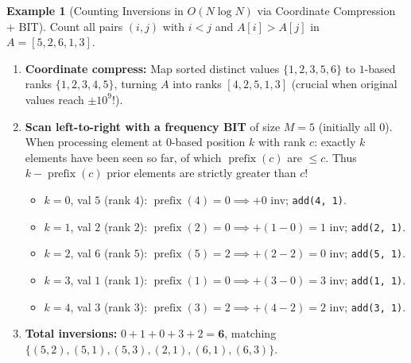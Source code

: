 \documentclass[11pt,a4paper]{article}
\theoremstyle{definition}
\newtheorem{example}{Example}[section]
\begin{document}
\begin{example}[Counting Inversions in $O(N \log N)$ via Coordinate Compression + BIT]
Count all pairs $(i, j)$ with $i < j$ and $A[i] > A[j]$ in $A = [5, 2, 6, 1, 3]$.
\begin{enumerate}[itemsep=2pt, topsep=2pt]
    \item \textbf{Coordinate compress:} Map sorted distinct values $\{1, 2, 3, 5, 6\}$ to $1$-based ranks $\{1, 2, 3, 4, 5\}$, turning $A$ into ranks $[4, 2, 5, 1, 3]$ (crucial when original values reach $\pm 10^9$!).
    \item \textbf{Scan left-to-right with a frequency BIT} of size $M = 5$ (initially all $0$). When processing element at $0$-based position $k$ with rank $c$: exactly $k$ elements have been seen so far, of which $\operatorname{prefix}(c)$ are $\le c$. Thus $k - \operatorname{prefix}(c)$ prior elements are strictly greater than $c$!
    \begin{itemize}[itemsep=1pt, topsep=1pt]
        \item $k = 0$, val $5$ (rank $4$): $\operatorname{prefix}(4) = 0 \implies +0$ inv; \texttt{add(4, 1)}.
        \item $k = 1$, val $2$ (rank $2$): $\operatorname{prefix}(2) = 0 \implies +(1 - 0) = 1$ inv; \texttt{add(2, 1)}.
        \item $k = 2$, val $6$ (rank $5$): $\operatorname{prefix}(5) = 2 \implies +(2 - 2) = 0$ inv; \texttt{add(5, 1)}.
        \item $k = 3$, val $1$ (rank $1$): $\operatorname{prefix}(1) = 0 \implies +(3 - 0) = 3$ inv; \texttt{add(1, 1)}.
        \item $k = 4$, val $3$ (rank $3$): $\operatorname{prefix}(3) = 2 \implies +(4 - 2) = 2$ inv; \texttt{add(3, 1)}.
    \end{itemize}
    \item \textbf{Total inversions:} $0 + 1 + 0 + 3 + 2 = \mathbf{6}$, matching $\{(5,2), (5,1), (5,3), (2,1), (6,1), (6,3)\}$.
\end{enumerate}
\end{example}
\end{document}
